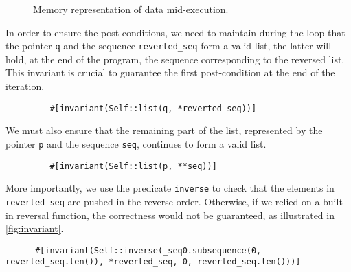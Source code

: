 \documentclass[11pt,a4paper]{article}
\begin{document}
\begin{itemize}
\begin{figure}[tp]
    
    \caption{Memory representation of data mid-execution.}
    \label{fig:invariant}
  \end{figure} 
    In order to ensure the post-conditions, we need to maintain during the loop that the pointer \texttt{q} and the sequence \texttt{reverted\_seq} form a valid list, the latter will hold, at the end of the program, the sequence corresponding to the reversed list. This invariant is crucial to guarantee the first post-condition at the end of the iteration.
    \begin{verbatim}
         #[invariant(Self::list(q, *reverted_seq))]
    \end{verbatim}
    
    We must also ensure that the remaining part of the list, represented by the pointer \texttt{p} and the sequence \texttt{seq}, continues to form a valid list. 
    \begin{verbatim}
         #[invariant(Self::list(p, **seq))]
    \end{verbatim}
    More importantly, we use the predicate \texttt{inverse} to check that the elements in \texttt{reverted\_seq} are pushed in the reverse order. Otherwise, if we relied on a built-in reversal function, the correctness would not be guaranteed, as illustrated in \autoref{fig:invariant}.
     \begin{verbatim}
      #[invariant(Self::inverse(_seq0.subsequence(0, reverted_seq.len()), *reverted_seq, 0, reverted_seq.len()))]
     \end{verbatim}
    
    
\end{itemize}
\end{document}
